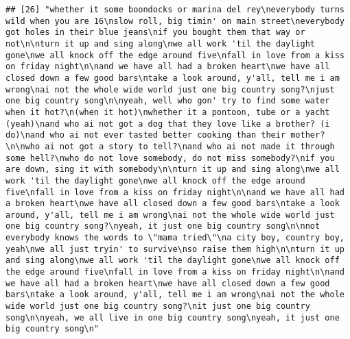 \documentclass[]{article}
\begin{document}
\begin{verbatim}
## [26] "whether it some boondocks or marina del rey\neverybody turns wild when you are 16\nslow roll, big timin' on main street\neverybody got holes in their blue jeans\nif you bought them that way or not\n\nturn it up and sing along\nwe all work 'til the daylight gone\nwe all knock off the edge around five\nfall in love from a kiss on friday night\n\nand we have all had a broken heart\nwe have all closed down a few good bars\ntake a look around, y'all, tell me i am wrong\nai not the whole wide world just one big country song?\njust one big country song\n\nyeah, well who gon' try to find some water when it hot?\n(when it hot)\nwhether it a pontoon, tube or a yacht (yeah)\nand who ai not got a dog that they love like a brother? (i do)\nand who ai not ever tasted better cooking than their mother?\n\nwho ai not got a story to tell?\nand who ai not made it through some hell?\nwho do not love somebody, do not miss somebody?\nif you are down, sing it with somebody\n\nturn it up and sing along\nwe all work 'til the daylight gone\nwe all knock off the edge around five\nfall in love from a kiss on friday night\n\nand we have all had a broken heart\nwe have all closed down a few good bars\ntake a look around, y'all, tell me i am wrong\nai not the whole wide world just one big country song?\nyeah, it just one big country song\n\nnot everybody knows the words to \"mama tried\"\na city boy, country boy, yeah\nwe all just tryin' to survive\nso raise them high\n\nturn it up and sing along\nwe all work 'til the daylight gone\nwe all knock off the edge around five\nfall in love from a kiss on friday night\n\nand we have all had a broken heart\nwe have all closed down a few good bars\ntake a look around, y'all, tell me i am wrong\nai not the whole wide world just one big country song?\nit just one big country song\n\nyeah, we all live in one big country song\nyeah, it just one big country song\n"                                                                                                                                                                                                                                                                                                                                                                                                                                                                                                                                                                                                                                                                                                                                                                                                                                                                                                                                                                                                   

\end{verbatim}
\end{document}
